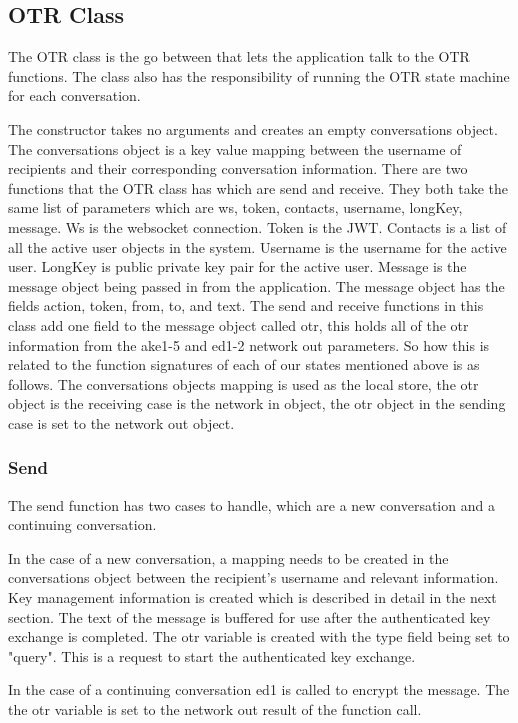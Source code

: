 \subsection{OTR Class}


The OTR class is the go between that lets the application talk to the OTR functions. The class also has the responsibility of running the OTR state machine for each conversation. 


The constructor takes no arguments and creates an empty conversations object. The conversations object is a key value mapping between the username of recipients and their corresponding conversation information. There are two functions that the OTR class has which are send and receive. They both take the same list of parameters which are ws, token, contacts, username, longKey, message. Ws is the websocket connection. Token is the JWT. Contacts is a list of all the active user objects in the system. Username is the username for the active user. LongKey is public private key pair for the active user. Message is the message object being passed in from the application. The message object has the fields action, token, from, to, and text. The send and receive functions in this class add one field to the message object called otr, this holds all of the otr information from the ake1-5 and ed1-2 network out parameters. So how this is related to the function signatures of each of our states mentioned above is as follows. The conversations objects mapping is used as the local store, the otr object is the receiving case is the network in object, the otr object in the sending case is set to the network out object.  


\subsubsection{Send}


The send function has two cases to handle, which are a new conversation and a continuing conversation.


In the case of a new conversation, a mapping needs to be created in the conversations object between the recipient's username and relevant information. Key management information is created which is described in detail in the next section. The text of the message is buffered for use after the authenticated key exchange is completed. The otr variable is created with the type field being set to "query". This is a request to start the authenticated key exchange.


In the case of a continuing conversation ed1 is called to encrypt the message. The the otr variable is set to the network out result of the function call. 


